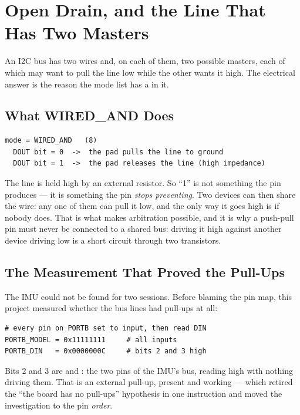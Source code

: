 \section{Open Drain, and the Line That Has Two Masters}
\label{sec:gpio-open-drain}

An I2C bus has two wires and, on each of them, two possible masters, each of which may want to pull
the line low while the other wants it high. The electrical answer is the reason the mode list has a
 in it.

\subsection{What WIRED\_AND Does}

\begin{verbatim}
mode = WIRED_AND   (8)
  DOUT bit = 0  ->  the pad pulls the line to ground
  DOUT bit = 1  ->  the pad releases the line (high impedance)
\end{verbatim}

The line is held high by an external resistor. So ``1'' is not something the pin produces — it is
something the pin \emph{stops preventing}. Two devices can then share the wire: any one of them can
pull it low, and the only way it goes high is if nobody does. That is what makes arbitration
possible, and it is why a push-pull pin must never be connected to a shared bus: driving it high
against another device driving low is a short circuit through two transistors.

\subsection{The Measurement That Proved the Pull-Ups}

The IMU could not be found for two sessions. Before blaming the pin map, this project measured
whether the bus lines had pull-ups at all:

\begin{verbatim}
# every pin on PORTB set to input, then read DIN
PORTB_MODEL = 0x11111111     # all inputs
PORTB_DIN   = 0x0000000C     # bits 2 and 3 high
\end{verbatim}

Bits 2 and 3 are  and : the two pins of the IMU's bus, reading high
with nothing driving them. That is an external pull-up, present and working — which retired the
``the board has no pull-ups'' hypothesis in one instruction and moved the investigation to the pin
\emph{order}.

